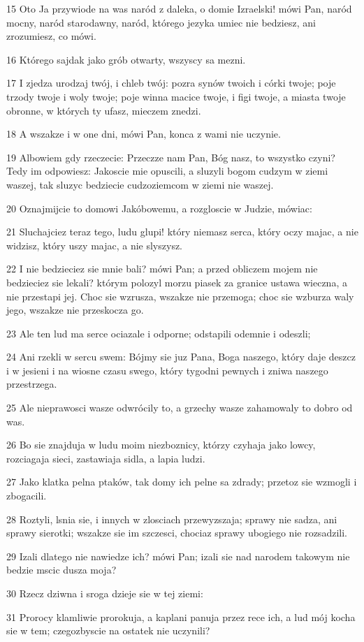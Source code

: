 \par 15 Oto Ja przywiode na was naród z daleka, o domie Izraelski! mówi Pan, naród mocny, naród starodawny, naród, którego jezyka umiec nie bedziesz, ani zrozumiesz, co mówi.
\par 16 Którego sajdak jako grób otwarty, wszyscy sa mezni.
\par 17 I zjedza urodzaj twój, i chleb twój: pozra synów twoich i córki twoje; poje trzody twoje i woly twoje; poje winna macice twoje, i figi twoje, a miasta twoje obronne, w których ty ufasz, mieczem znedzi.
\par 18 A wszakze i w one dni, mówi Pan, konca z wami nie uczynie.
\par 19 Albowiem gdy rzeczecie: Przeczze nam Pan, Bóg nasz, to wszystko czyni? Tedy im odpowiesz: Jakoscie mie opuscili, a sluzyli bogom cudzym w ziemi waszej, tak sluzyc bedziecie cudzoziemcom w ziemi nie waszej.
\par 20 Oznajmijcie to domowi Jakóbowemu, a rozgloscie w Judzie, mówiac:
\par 21 Sluchajciez teraz tego, ludu glupi! który niemasz serca, który oczy majac, a nie widzisz, który uszy majac, a nie slyszysz.
\par 22 I nie bedzieciez sie mnie bali? mówi Pan; a przed obliczem mojem nie bedzieciez sie lekali? którym polozyl morzu piasek za granice ustawa wieczna, a nie przestapi jej. Choc sie wzrusza, wszakze nie przemoga; choc sie wzburza waly jego, wszakze nie przeskocza go.
\par 23 Ale ten lud ma serce ociazale i odporne; odstapili odemnie i odeszli;
\par 24 Ani rzekli w sercu swem: Bójmy sie juz Pana, Boga naszego, który daje deszcz i w jesieni i na wiosne czasu swego, który tygodni pewnych i zniwa naszego przestrzega.
\par 25 Ale nieprawosci wasze odwrócily to, a grzechy wasze zahamowaly to dobro od was.
\par 26 Bo sie znajduja w ludu moim niezboznicy, którzy czyhaja jako lowcy, rozciagaja sieci, zastawiaja sidla, a lapia ludzi.
\par 27 Jako klatka pelna ptaków, tak domy ich pelne sa zdrady; przetoz sie wzmogli i zbogacili.
\par 28 Roztyli, lsnia sie, i innych w zlosciach przewyzszaja; sprawy nie sadza, ani sprawy sierotki; wszakze sie im szczesci, chociaz sprawy ubogiego nie rozsadzili.
\par 29 Izali dlatego nie nawiedze ich? mówi Pan; izali sie nad narodem takowym nie bedzie mscic dusza moja?
\par 30 Rzecz dziwna i sroga dzieje sie w tej ziemi:
\par 31 Prorocy klamliwie prorokuja, a kaplani panuja przez rece ich, a lud mój kocha sie w tem; czegozbyscie na ostatek nie uczynili?


